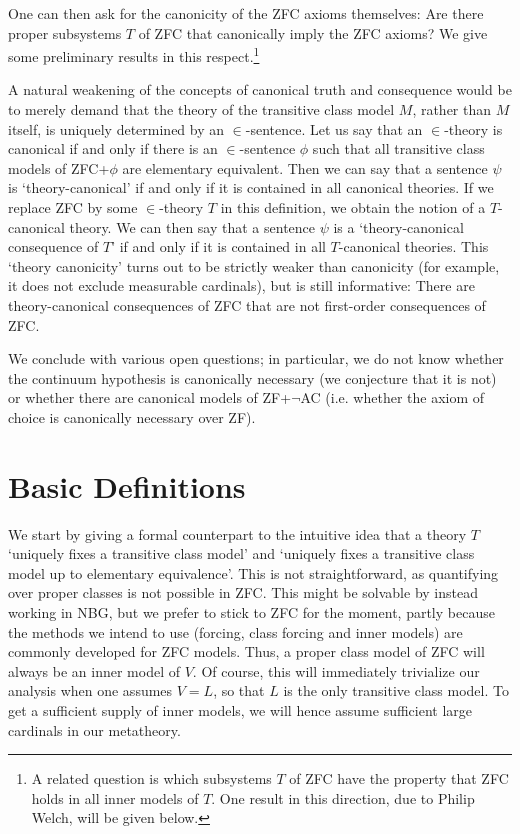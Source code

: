 \documentclass[a4paper,12pt]{amsart}
\theoremstyle{definition}
\begin{document}
One can then ask for the canonicity of the ZFC axioms themselves: Are there proper subsystems $T$ of ZFC that canonically imply the ZFC axioms? We give some preliminary results in this respect.\footnote{A related question is which subsystems $T$ of ZFC have the property that ZFC holds in all inner models of $T$. One result in this direction, due to Philip Welch, will be given below.}

A natural weakening of the concepts of canonical truth and consequence would be to merely demand that the theory of the transitive class model $M$, rather than $M$ itself, is uniquely determined by an $\in$-sentence. Let us say that an $\in$-theory is canonical if and only if there is an $\in$-sentence $\phi$ such that all transitive class models of ZFC+$\phi$ are elementary equivalent. Then we can say that a sentence $\psi$ is `theory-canonical' if and only if it is contained in all canonical theories. If we replace ZFC by some $\in$-theory $T$ in this definition, we obtain the notion of a $T$-canonical theory. We can then say that a sentence $\psi$ is a `theory-canonical consequence of $T$' if and only if  it is contained in all $T$-canonical theories. This `theory canonicity' turns out to be strictly weaker than canonicity (for example, it does not exclude measurable cardinals), but is still informative: There are theory-canonical consequences of ZFC that are not first-order consequences of ZFC.

We conclude with various open questions; in particular, we do not know whether 
the continuum hypothesis is canonically necessary (we conjecture that it is not) or whether there are canonical models of ZF+$\neg$AC (i.e. whether the axiom of choice is canonically necessary over ZF). 


\section{Basic Definitions}

We start by giving a formal counterpart to the intuitive idea that a theory $T$ `uniquely fixes a transitive class model' and `uniquely fixes a transitive class model up to elementary equivalence'. This is not straightforward, as quantifying over proper classes
is not possible in ZFC. This might be solvable by instead working in NBG, but we prefer to stick to ZFC for the moment, partly because the methods we intend to use (forcing, class forcing and inner models)
are commonly developed for ZFC models. Thus, a proper class model of ZFC will always be an inner model of $V$. Of course, this will immediately trivialize our analysis
when one assumes $V=L$, so that $L$ is the only transitive class model. To get a sufficient supply of inner models, we will hence assume sufficient large cardinals in our metatheory.
\end{document}
